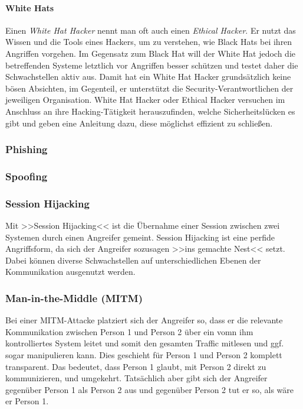 \paragraph{White Hats} Einen \textit{White Hat Hacker} nennt man oft auch einen \textit{Ethical Hacker}. Er nutzt das Wissen und die Tools eines Hackers, um zu verstehen, wie Black Hats bei ihren Angriffen vorgehen. Im Gegensatz zum Black Hat will der White Hat jedoch die betreffenden Systeme letztlich vor Angriffen besser schützen und testet daher die Schwachstellen aktiv aus. Damit hat ein White Hat Hacker grundsätzlich keine bösen Absichten, im Gegenteil, er unterstützt die Security-Verantwortlichen der jeweiligen Organisation. White Hat Hacker oder Ethical Hacker versuchen im Anschluss an ihre Hacking-Tätigkeit herauszufinden, welche Sicherheitslücken es gibt und geben eine Anleitung dazu, diese möglichst effizient zu schließen.

\subsubsection{Phishing}
\label{sec:Phishing}


\subsubsection{Spoofing}
\label{sec:Spoofing}


\subsubsection{Session Hijacking}
\label{sec:SessionHijacking}

Mit >>Session Hijacking<< ist die Übernahme einer Session zwischen zwei Systemen durch einen Angreifer gemeint. Session Hijacking ist eine perfide Angriffsform, da sich der Angreifer sozusagen >>ins gemachte Nest<< setzt. Dabei können diverse Schwachstellen auf unterschiedlichen Ebenen der Kommunikation ausgenutzt werden.


\subsubsection{Man-in-the-Middle (MITM)}
\label{sec:ManInTheMiddle}

Bei einer MITM-Attacke platziert sich der Angreifer so, dass er die relevante Kommunikation zwischen Person 1 und Person 2 über ein vomn ihm kontrolliertes System leitet und somit den gesamten Traffic mitlesen und ggf. sogar manipulieren kann. Dies geschieht für Person 1 und Person 2 komplett transparent. Das bedeutet, dass Person 1 glaubt, mit Person 2 direkt zu kommunizieren, und umgekehrt. Tatsächlich aber gibt sich der Angreifer gegenüber Person 1 als Person 2 aus und gegenüber Person 2 tut er so, als wäre er Person 1.


